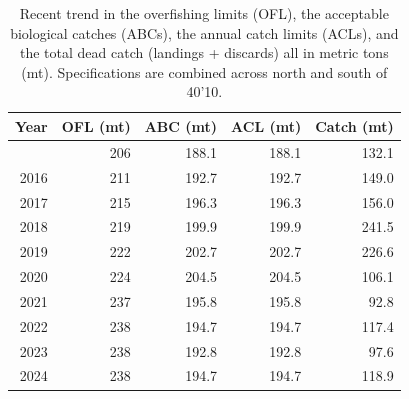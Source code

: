 \documentclass[
]{scrartcl}
\begin{document}
\endgroup

\newpage{}

\begingroup
\fontsize{9.0pt}{10.8pt}\selectfont

\begin{longtable}{rrrrr}

\caption{\label{tbl-man-management}Recent trend in the overfishing
limits (OFL), the acceptable biological catches (ABCs), the annual catch
limits (ACLs), and the total dead catch (landings + discards) all in
metric tons (mt). Specifications are combined across north and south of
40'10.}

\tabularnewline

\toprule
Year & OFL (mt) & ABC (mt) & ACL (mt) & Catch (mt) \\ 
\midrule\addlinespace[2.5pt]
2015 & 206 & 188.1 & 188.1 & 132.1 \\ 
2016 & 211 & 192.7 & 192.7 & 149.0 \\ 
2017 & 215 & 196.3 & 196.3 & 156.0 \\ 
2018 & 219 & 199.9 & 199.9 & 241.5 \\ 
2019 & 222 & 202.7 & 202.7 & 226.6 \\ 
2020 & 224 & 204.5 & 204.5 & 106.1 \\ 
2021 & 237 & 195.8 & 195.8 & 92.8 \\ 
2022 & 238 & 194.7 & 194.7 & 117.4 \\ 
2023 & 238 & 192.8 & 192.8 & 97.6 \\ 
2024 & 238 & 194.7 & 194.7 & 118.9 \\ 
\bottomrule

\end{longtable}

\endgroup

\newpage{}
\end{document}
